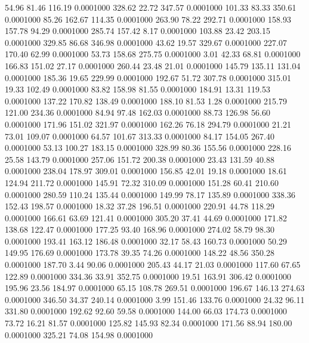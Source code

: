   54.96   81.46  116.19   0.0001000
 328.62   22.72  347.57   0.0001000
 101.33   83.33  350.61   0.0001000
  85.26  162.67  114.35   0.0001000
 263.90   78.22  292.71   0.0001000
 158.93  157.78   94.29   0.0001000
 285.74  157.42    8.17   0.0001000
 103.88   23.42  203.15   0.0001000
 329.85   86.68  346.98   0.0001000
  43.62   19.57  329.67   0.0001000
 227.07  170.40   62.99   0.0001000
  53.73  158.68  275.75   0.0001000
   3.01   42.33   68.81   0.0001000
 166.83  151.02   27.17   0.0001000
 260.44   23.48   21.01   0.0001000
 145.79  135.11  131.04   0.0001000
 185.36   19.65  229.99   0.0001000
 192.67   51.72  307.78   0.0001000
 315.01   19.33  102.49   0.0001000
  83.82  158.98   81.55   0.0001000
 184.91   13.31  119.53   0.0001000
 137.22  170.82  138.49   0.0001000
 188.10   81.53    1.28   0.0001000
 215.79  121.00  234.36   0.0001000
  84.94   97.48  162.03   0.0001000
  88.73  126.98   56.60   0.0001000
 171.96  151.02  321.97   0.0001000
 162.26   76.18  294.79   0.0001000
  21.21   73.01  109.07   0.0001000
  64.57  101.67  313.33   0.0001000
  84.17  154.05  267.40   0.0001000
  53.13  100.27  183.15   0.0001000
 328.99   80.36  155.56   0.0001000
 228.16   25.58  143.79   0.0001000
 257.06  151.72  200.38   0.0001000
  23.43  131.59   40.88   0.0001000
 238.04  178.97  309.01   0.0001000
 156.85   42.01   19.18   0.0001000
  18.61  124.94  211.72   0.0001000
 145.91   72.32  310.09   0.0001000
 151.28   60.41  210.60   0.0001000
 280.59  110.24  135.44   0.0001000
 149.99   78.17  135.89   0.0001000
 338.36  152.43  198.57   0.0001000
  18.32   37.28  196.51   0.0001000
 220.91   44.78  118.29   0.0001000
 166.61   63.69  121.41   0.0001000
 305.20   37.41   44.69   0.0001000
 171.82  138.68  122.47   0.0001000
 177.25   93.40  168.96   0.0001000
 274.02   58.79   98.30   0.0001000
 193.41  163.12  186.48   0.0001000
  32.17   58.43  160.73   0.0001000
  50.29  149.95  176.69   0.0001000
 173.78   39.35   74.26   0.0001000
 148.22   48.56  350.28   0.0001000
 187.70    3.44   90.06   0.0001000
 205.43   44.17   21.03   0.0001000
 117.60   67.65  122.89   0.0001000
 334.36   33.91  352.75   0.0001000
  19.51  163.91  306.42   0.0001000
 195.96   23.56  184.97   0.0001000
  65.15  108.78  269.51   0.0001000
 196.67  146.13  274.63   0.0001000
 346.50   34.37  240.14   0.0001000
   3.99  151.46  133.76   0.0001000
  24.32   96.11  331.80   0.0001000
 192.62   92.60   59.58   0.0001000
 144.00   66.03  174.73   0.0001000
  73.72   16.21   81.57   0.0001000
 125.82  145.93   82.34   0.0001000
 171.56   88.94  180.00   0.0001000
 325.21   74.08  154.98   0.0001000
